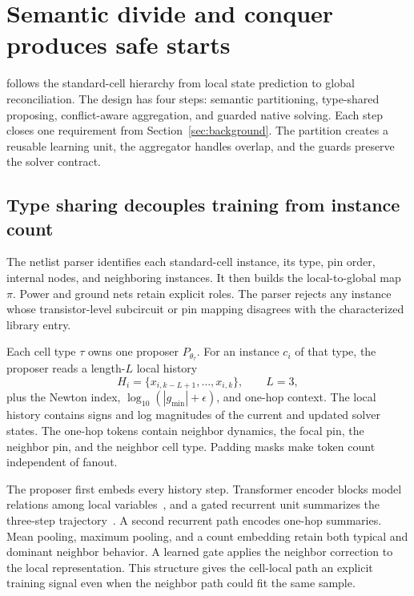\section{Semantic divide and conquer produces safe starts}
\label{sec:design}

\system{} follows the standard-cell hierarchy from local state prediction to global reconciliation. The design has four steps: semantic partitioning, type-shared proposing, conflict-aware aggregation, and guarded native solving. Each step closes one requirement from Section~\ref{sec:background}. The partition creates a reusable learning unit, the aggregator handles overlap, and the guards preserve the solver contract.

\subsection{Type sharing decouples training from instance count}

The netlist parser identifies each standard-cell instance, its type, pin order, internal nodes, and neighboring instances. It then builds the local-to-global map $\pi$. Power and ground nets retain explicit roles. The parser rejects any instance whose transistor-level subcircuit or pin mapping disagrees with the characterized library entry.

Each cell type $\tau$ owns one proposer $P_{\theta_\tau}$. For an instance $c_i$ of that type, the proposer reads a length-$L$ local history
\begin{equation}
H_i=\{x_{i,k-L+1},\ldots,x_{i,k}\}, \qquad L=3,
\end{equation}
plus the Newton index, $\log_{10}(|g_{\min}|+\epsilon)$, and one-hop context. The local history contains signs and log magnitudes of the current and updated solver states. The one-hop tokens contain neighbor dynamics, the focal pin, the neighbor pin, and the neighbor cell type. Padding masks make token count independent of fanout.

The proposer first embeds every history step. Transformer encoder blocks model relations among local variables~\cite{vaswani2017attention}, and a gated recurrent unit summarizes the three-step trajectory~\cite{cho2014gru}. A second recurrent path encodes one-hop summaries. Mean pooling, maximum pooling, and a count embedding retain both typical and dominant neighbor behavior. A learned gate applies the neighbor correction to the local representation. This structure gives the cell-local path an explicit training signal even when the neighbor path could fit the same sample.

